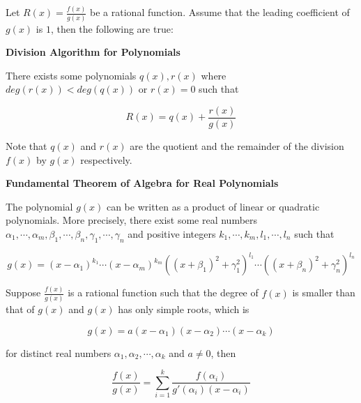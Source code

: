 \begin{thm}
  Let $R(x)=\frac{f(x)}{g(x)}$ be a rational function. Assume that the leading coefficient of $g(x)$ is $1$, then the following are true:

  \begin{alist}
    \item \textbf{Division Algorithm for Polynomials}\n

    There exists some polynomials $q(x),r(x)$ where $deg(r(x))<deg(q(x))$ or $r(x)=0$ such that

    $$R(x)=q(x)+\frac{r(x)}{g(x)}$$\s

    Note that $q(x)$ and $r(x)$ are the quotient and the remainder of the division $f(x)$ by $g(x)$ respectively.

    \item \textbf{Fundamental Theorem of Algebra for Real Polynomials}\n

    The polynomial $g(x)$ can be written as a product of linear or quadratic polynomials. More precisely, there exist some real numbers $\alpha_{1},\cdots,\alpha_{m},\beta_{1},\cdots,\beta_{n},\gamma_{1},\cdots,\gamma_{n}$ and positive integers $k_{1},\cdots,k_{m},l_{1},\cdots,l_{n}$ such that

    $$g(x)=(x-\alpha_{1})^{k_{1}}\cdots(x-\alpha_{m})^{k_{m}}((x+\beta_{1})^{2}+\gamma_{1}^{2})^{l_{1}}\cdots((x+\beta_{n})^{2}+\gamma_{n}^{2})^{l_{n}}$$
  \end{alist}
\end{thm}\n

\begin{thm}
  Suppose $\frac{f(x)}{g(x)}$ is a rational function such that the degree of $f(x)$ is smaller than that of $g(x)$ and $g(x)$ has only simple roots, which is

  $$g(x)=a(x-\alpha_{1})(x-\alpha_{2})\cdots(x-\alpha_{k})$$\s

  for distinct real numbers $\alpha_{1},\alpha_{2},\cdots,\alpha_{k}$ and $a\neq 0$, then

  $$\frac{f(x)}{g(x)}=\sum_{i=1}^{k}\frac{f(\alpha_{i})}{g'(\alpha_{i})(x-\alpha_{i})}$$
\end{thm}

\pagebreak


